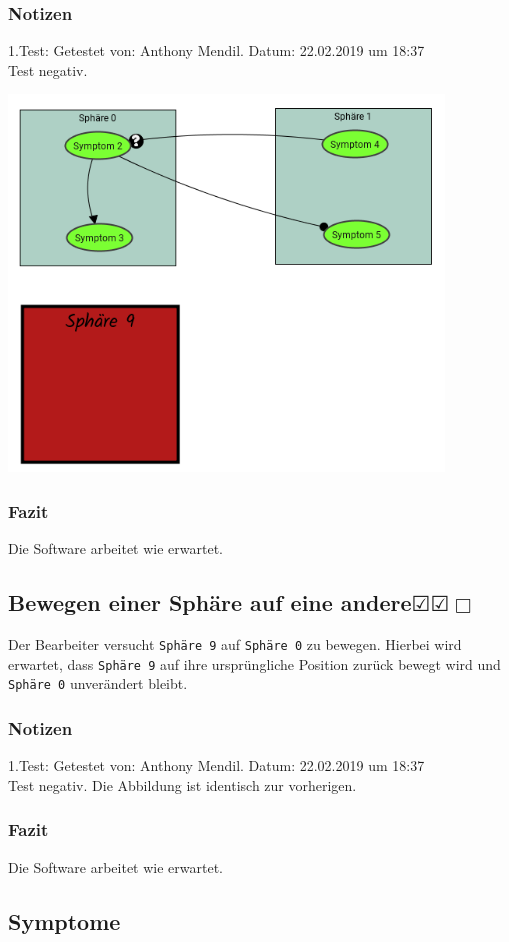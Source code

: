 \documentclass{scrartcl}
\newcommand{\subsectiont}[2]{\subsection[#1]{#1{\normalsize\normalfont #2}}}
\newcommand{\leer}{$\Box$}
\newcommand{\ok}{$\CheckedBox$}
\begin{document}
\subsubsection{Notizen}
1.Test: Getestet von: Anthony Mendil. Datum: 22.02.2019 um 18:37 \\
Test negativ.
\begin{center}
\includegraphics[height=10cm]{2_18.PNG}
\end{center}
\subsubsection{Fazit}
Die Software arbeitet wie erwartet.

\subsectiont{Bewegen einer Sphäre auf eine andere}{\dotfill\ok\ok\leer}
Der Bearbeiter versucht \texttt{Sphäre 9} auf \texttt{Sphäre 0} zu bewegen. Hierbei wird erwartet, dass \texttt{Sphäre 9} auf ihre ursprüngliche Position zurück bewegt wird und \texttt{Sphäre 0} unverändert bleibt.   
\subsubsection{Notizen}
1.Test: Getestet von: Anthony Mendil. Datum: 22.02.2019 um 18:37 \\
Test negativ. Die Abbildung ist identisch zur vorherigen. 
\subsubsection{Fazit}
Die Software arbeitet wie erwartet.

\subsection*{Symptome}
\end{document}
